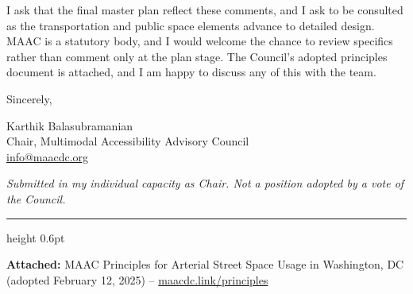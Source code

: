 \documentclass[11pt]{article}
\newcommand{\heading}[1]{\Needspace*{5\baselineskip}\vspace{3mm}{\color{maacnavy}\bfseries\large #1\par}\vspace{-3pt}{\color{rulegrey}\hrule height 0.8pt}\vspace{1mm}\nopagebreak}
\begin{document}
\heading{Request}

I ask that the final master plan reflect these comments, and I ask to be
consulted as the transportation and public space elements advance to detailed
design. MAAC is a statutory body, and I would welcome the chance to review
specifics rather than comment only at the plan stage. The Council's adopted
principles document is attached, and I am happy to discuss any of this with the
team.

\vspace{2mm}

Sincerely,

\vspace{5mm}

Karthik Balasubramanian\\
Chair, Multimodal Accessibility Advisory Council\\
\href{mailto:info@maacdc.org}{info@maacdc.org}

{\footnotesize\itshape Submitted in my individual capacity as Chair. Not a position
adopted by a vote of the Council.\par}

\vspace{3mm}
{\color{rulegrey}\hrule height 0.6pt}
\vspace{2mm}

{\footnotesize\color{maacnavy}\textbf{Attached:} MAAC Principles for Arterial Street
Space Usage in Washington, DC (adopted February 12, 2025) --
\href{https://maacdc.link/principles}{maacdc.link/principles}\par}
\end{document}
